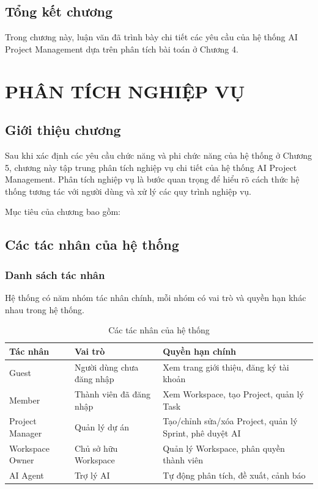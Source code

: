 \documentclass[12pt,a4paper]{report}
\begin{document}
\section{Tổng kết chương}


Trong chương này, luận văn đã trình bày chi tiết các yêu cầu của hệ thống AI Project Management dựa trên phân tích bài toán ở Chương 4.

\chapter{PHÂN TÍCH NGHIỆP VỤ}
\label{chap:business_analysis}

\section{Giới thiệu chương}

Sau khi xác định các yêu cầu chức năng và phi chức năng của hệ thống ở Chương 5, chương này tập trung phân tích nghiệp vụ chi tiết của hệ thống AI Project Management. Phân tích nghiệp vụ là bước quan trọng để hiểu rõ cách thức hệ thống tương tác với người dùng và xử lý các quy trình nghiệp vụ.

Mục tiêu của chương bao gồm:
\section{Các tác nhân của hệ thống}

\subsection{Danh sách tác nhân}

Hệ thống có năm nhóm tác nhân chính, mỗi nhóm có vai trò và quyền hạn khác nhau trong hệ thống.

\begin{table}[H]
\centering
\caption{Các tác nhân của hệ thống}
\begin{tabular}{|p{3cm}|p{3.5cm}|p{8cm}|}
\hline
\textbf{Tác nhân} & \textbf{Vai trò} & \textbf{Quyền hạn chính} \\
\hline
Guest & Người dùng chưa đăng nhập & Xem trang giới thiệu, đăng ký tài khoản \\
\hline
Member & Thành viên đã đăng nhập & Xem Workspace, tạo Project, quản lý Task \\
\hline
Project Manager & Quản lý dự án & Tạo/chỉnh sửa/xóa Project, quản lý Sprint, phê duyệt AI \\
\hline
Workspace Owner & Chủ sở hữu Workspace & Quản lý Workspace, phân quyền thành viên \\
\hline
AI Agent & Trợ lý AI & Tự động phân tích, đề xuất, cảnh báo \\
\hline
\end{tabular}
\label{tab:actors}
\end{table}
\end{document}
